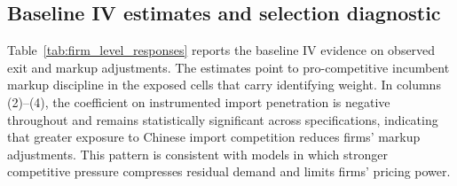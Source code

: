 \documentclass[12pt]{article}
\begin{document}
\subsection{Baseline IV estimates and selection diagnostic}
    
Table~\ref{tab:firm_level_responses} reports the baseline IV evidence on observed exit and markup adjustments. The estimates point to pro-competitive incumbent markup discipline in the exposed cells that carry identifying weight. In columns (2)--(4), the coefficient on instrumented import penetration is negative throughout and remains statistically significant across specifications, indicating that greater exposure to Chinese import competition reduces firms' markup adjustments. This pattern is consistent with models in which stronger competitive pressure compresses residual demand and limits firms' pricing power.
\end{document}
